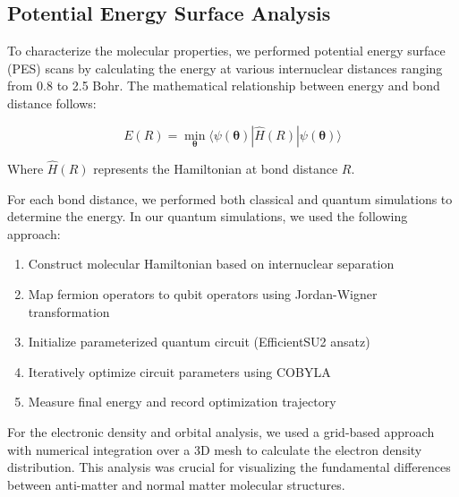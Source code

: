 \documentclass[10pt,twocolumn,a4paper]{article}
\begin{document}
\subsection{Potential Energy Surface Analysis}
To characterize the molecular properties, we performed potential energy surface (PES) scans by calculating the energy at various internuclear distances ranging from 0.8 to 2.5 Bohr. The mathematical relationship between energy and bond distance follows:

\begin{equation}
E(R) = \min_{\boldsymbol{\theta}} \langle\psi(\boldsymbol{\theta})|\hat{H}(R)|\psi(\boldsymbol{\theta})\rangle
\end{equation}

Where $\hat{H}(R)$ represents the Hamiltonian at bond distance $R$. 

For each bond distance, we performed both classical and quantum simulations to determine the energy. In our quantum simulations, we used the following approach:

\begin{enumerate}
    \item Construct molecular Hamiltonian based on internuclear separation
    \item Map fermion operators to qubit operators using Jordan-Wigner transformation
    \item Initialize parameterized quantum circuit (EfficientSU2 ansatz)
    \item Iteratively optimize circuit parameters using COBYLA
    \item Measure final energy and record optimization trajectory
\end{enumerate}

For the electronic density and orbital analysis, we used a grid-based approach with numerical integration over a 3D mesh to calculate the electron density distribution. This analysis was crucial for visualizing the fundamental differences between anti-matter and normal matter molecular structures.
\end{document}
